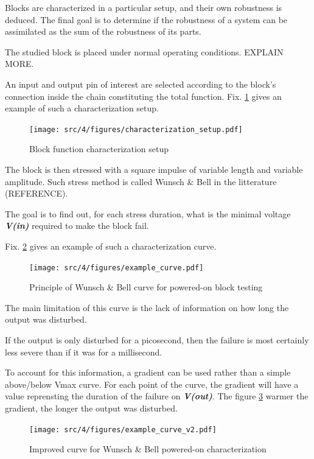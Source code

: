 Blocks are characterized in a particular setup, and their own robustness is deduced. The final goal is to determine if the robustness of
a system can be assimilated as the sum of the robustness of its parts.

The studied block is placed under normal operating conditions. EXPLAIN MORE.

An input and output pin of interest are selected according to the block's connection inside the chain constituting the total function.
Fix. \ref{block_function_cz} gives an example of such a characterization setup.

\begin{figure}[!htbp]
  \centering
  \texttt{[image: src/4/figures/characterization\_setup.pdf]}
  \caption{Block function characterization setup}
  \label{block_function_cz}
\end{figure}

The block is then stressed with a square impulse of variable length and variable amplitude.
Such stress method is called Wunsch & Bell in the litterature (REFERENCE).

The goal is to find out, for each stress duration, what is the minimal voltage \textbf{\textit{V(in)}} required to make the block fail.

Fix. \ref{wb_cz_curve_example} gives an example of such a characterization curve.

\begin{figure}[!htbp]
  \centering
  \texttt{[image: src/4/figures/example\_curve.pdf]}
  \caption{Principle of Wunsch & Bell curve for powered-on block testing}
  \label{wb_cz_curve_example}
\end{figure}

The main limitation of this curve is the lack of information on how long the output was disturbed.

If the output is only disturbed for a picosecond, then the failure is most certainly less severe than if it was for a millisecond.

To account for this information, a gradient can be used rather than a simple above/below Vmax curve.
For each point of the curve, the gradient will have a value reprensting the duration of the failure on \textbf{\textit{V(out)}}.
The figure \ref{wb_cz_curve_example_v2} warmer the gradient, the longer the output was disturbed.

\begin{figure}[!htbp]
  \centering
  \texttt{[image: src/4/figures/example\_curve\_v2.pdf]}
  \caption{Improved curve for Wunsch & Bell powered-on characterization}
  \label{wb_cz_curve_example_v2}
\end{figure}

